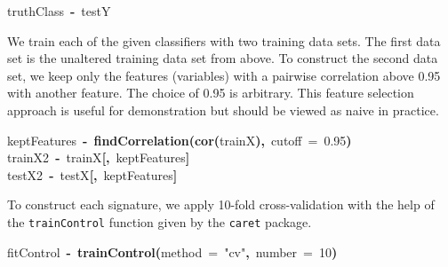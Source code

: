 \documentclass{article}
\makeatletter
\newcommand{\hlnumber}[1]{\textcolor[rgb]{0,0,0}{#1}}%
\newcommand{\hlfunctioncall}[1]{\textcolor[rgb]{.5,0,.33}{\textbf{#1}}}%
\newcommand{\hlstring}[1]{\textcolor[rgb]{.6,.6,1}{#1}}%
\newcommand{\hlkeyword}[1]{\textbf{#1}}%
\newcommand{\hlargument}[1]{\textcolor[rgb]{.69,.25,.02}{#1}}%
\newcommand{\hlassignement}[1]{\textbf{#1}}%
\newcommand{\hlsymbol}[1]{#1}%
\newcommand{\hlstd}[1]{\textcolor[rgb]{0,0,0}{#1}}%
\newenvironment{kframe}{%
 \def\FrameCommand##1{\hskip\@totalleftmargin \hskip-\fboxsep
 \colorbox{shadecolor}{##1}\hskip-\fboxsep
     \hskip-\linewidth \hskip-\@totalleftmargin \hskip\columnwidth}%
 \MakeFramed {\advance\hsize-\width
   \@totalleftmargin\z@ \linewidth\hsize
   \@setminipage}}%
 {\par\unskip\endMakeFramed}
\newenvironment{knitrout}{}{} %
\makeatother
\begin{document}
\begin{knitrout}
\color{fgcolor}\begin{kframe}
\begin{flushleft}
\ttfamily\noindent
\hlsymbol{truthClass}{\ }\hlassignement{\usebox{\hlnormalsizeboxlessthan}-}{\ }\hlsymbol{testY}\mbox{}
\normalfont
\end{flushleft}
\end{kframe}
\end{knitrout}


We train each of the given classifiers with two training data sets.
The first data set is the unaltered training data set from above.
To construct the second data set, we keep only the features (variables) with
a pairwise correlation above 0.95 with another feature. The choice of 0.95 is
arbitrary. This feature selection approach is useful for demonstration but should
be viewed as naive in practice.

\begin{knitrout}
\color{fgcolor}\begin{kframe}
\begin{flushleft}
\ttfamily\noindent
\hlsymbol{keptFeatures}{\ }\hlassignement{\usebox{\hlnormalsizeboxlessthan}-}{\ }\hlfunctioncall{findCorrelation}\hlkeyword{(}\hlfunctioncall{cor}\hlkeyword{(}\hlsymbol{trainX}\hlkeyword{)}\hlkeyword{,}{\ }\hlargument{cutoff}{\ }\hlargument{=}{\ }\hlnumber{0.95}\hlkeyword{)}\hspace*{\fill}\\
\hlstd{}\hlsymbol{trainX2}{\ }\hlassignement{\usebox{\hlnormalsizeboxlessthan}-}{\ }\hlsymbol{trainX}\hlkeyword{[}\hlkeyword{,}{\ }\hlsymbol{keptFeatures}\hlkeyword{]}\hspace*{\fill}\\
\hlstd{}\hlsymbol{testX2}{\ }\hlassignement{\usebox{\hlnormalsizeboxlessthan}-}{\ }\hlsymbol{testX}\hlkeyword{[}\hlkeyword{,}{\ }\hlsymbol{keptFeatures}\hlkeyword{]}\mbox{}
\normalfont
\end{flushleft}
\end{kframe}
\end{knitrout}


To construct each signature, we apply 10-fold cross-validation with the help of
the {\tt trainControl} function given by the {\tt caret} package.
\begin{knitrout}
\color{fgcolor}\begin{kframe}
\begin{flushleft}
\ttfamily\noindent
\hlsymbol{fitControl}{\ }\hlassignement{\usebox{\hlnormalsizeboxlessthan}-}{\ }\hlfunctioncall{trainControl}\hlkeyword{(}\hlargument{method}{\ }\hlargument{=}{\ }\hlstring{"{}cv"{}}\hlkeyword{,}{\ }\hlargument{number}{\ }\hlargument{=}{\ }\hlnumber{10}\hlkeyword{)}\mbox{}
\normalfont
\end{flushleft}
\end{kframe}
\end{knitrout}
\end{document}
